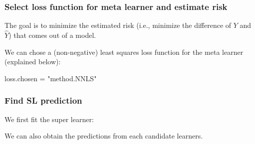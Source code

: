 \documentclass[
]{book}
\newenvironment{Shaded}{\begin{snugshade}}{\end{snugshade}}
\newcommand{\AttributeTok}[1]{\textcolor[rgb]{0.77,0.63,0.00}{#1}}
\newcommand{\FunctionTok}[1]{\textcolor[rgb]{0.00,0.00,0.00}{#1}}
\newcommand{\NormalTok}[1]{#1}
\newcommand{\OtherTok}[1]{\textcolor[rgb]{0.56,0.35,0.01}{#1}}
\newcommand{\SpecialCharTok}[1]{\textcolor[rgb]{0.00,0.00,0.00}{#1}}
\newcommand{\StringTok}[1]{\textcolor[rgb]{0.31,0.60,0.02}{#1}}
\begin{document}
\hypertarget{select-loss-function-for-meta-learner-and-estimate-risk}{%
\subsubsection{Select loss function for meta learner and estimate risk}\label{select-loss-function-for-meta-learner-and-estimate-risk}}

\begin{rmdcomment}
The goal is to minimize the estimated risk (i.e., minimize the
difference of \(Y\) and \(\hat{Y}\)) that comes out of a model.
\end{rmdcomment}

We can chose a (non-negative) least squares loss function for the meta learner (explained below):

\begin{Shaded}
\begin{Highlighting}[]
\NormalTok{loss.chosen }\OtherTok{=} \StringTok{"method.NNLS"}
\end{Highlighting}
\end{Shaded}

\hypertarget{find-sl-prediction}{%
\subsubsection{Find SL prediction}\label{find-sl-prediction}}

We first fit the super learner:

\begin{Shaded}
\end{Shaded}

We can also obtain the predictions from each candidate learners.
\end{document}
